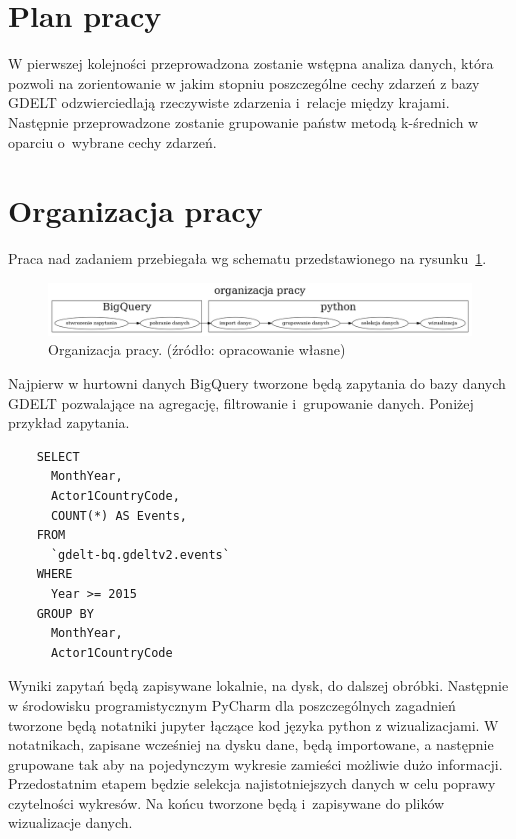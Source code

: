 \documentclass[11pt]{report}
\begin{document}
    \section{Plan pracy}\label{sec:plan-pracy}

    W pierwszej kolejności przeprowadzona zostanie wstępna analiza danych, która pozwoli na zorientowanie w jakim stopniu poszczególne cechy zdarzeń z bazy GDELT odzwierciedlają rzeczywiste zdarzenia i~relacje między krajami.
    Następnie przeprowadzone zostanie grupowanie państw metodą k-średnich w oparciu o~wybrane cechy zdarzeń.


    \section{Organizacja pracy}\label{sec:organizacja-pracy}
    Praca nad zadaniem przebiegała wg schematu przedstawionego na rysunku~\ref{fig:organizacjia}.

    \begin{figure}[!htp]
        \centering
        \includegraphics[width=\linewidth]{fig/organizacja.png}
        \caption{Organizacja pracy. (źródło: opracowanie własne)}
        \label{fig:organizacjia}
    \end{figure}

    Najpierw w hurtowni danych BigQuery tworzone będą zapytania do bazy danych GDELT pozwalające na agregację, filtrowanie i~grupowanie danych.
    Poniżej przykład zapytania.

    \begin{verbatim}
    SELECT
      MonthYear,
      Actor1CountryCode,
      COUNT(*) AS Events,
    FROM
      `gdelt-bq.gdeltv2.events`
    WHERE
      Year >= 2015
    GROUP BY
      MonthYear,
      Actor1CountryCode
    \end{verbatim}

    Wyniki zapytań będą zapisywane lokalnie, na dysk, do dalszej obróbki.
    Następnie w środowisku programistycznym PyCharm dla poszczególnych zagadnień tworzone będą notatniki jupyter łączące kod języka python z wizualizacjami.
    W notatnikach, zapisane wcześniej na dysku dane, będą importowane, a następnie grupowane tak aby na pojedynczym wykresie zamieści możliwie dużo informacji.
    Przedostatnim etapem będzie selekcja najistotniejszych danych w celu poprawy czytelności wykresów.
    Na końcu tworzone będą i~zapisywane do plików wizualizacje danych.
\end{document}

